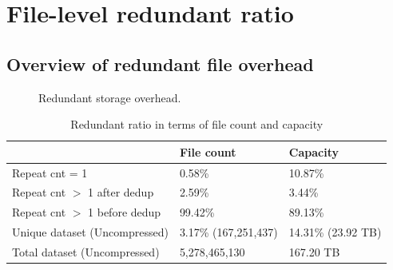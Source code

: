 \section{File-level redundant ratio}
\label{sec:dedup}

\subsection{Overview of redundant file overhead}

\begin{figure}
	\centering
	\caption{Redundant storage overhead.}
	\label{fig:over-dup-overhead}
\end{figure}

\begin{table} 
	\centering 
	\scriptsize  
	\caption{Redundant ratio in terms of file count and capacity} \label{tbl:overall-redundant_ratio} 
	\begin{tabular}{|l|l|l|}%
		\hline  
		       & File count & Capacity \\
		\hline
		Repeat cnt = 1 & 0.58\% & 10.87\%\\
		\hline
		Repeat cnt $>$ 1 after dedup & 2.59\% & 3.44\%\\
		\hline
		Repeat cnt $>$ 1 before dedup  & 99.42\%  & 89.13\%\\
		\hline
		Unique dataset (Uncompressed) & 3.17\% (167,251,437)  &  14.31\% (23.92 TB) \\
		\hline 
		Total dataset (Uncompressed) & 5,278,465,130 & 167.20 TB \\
		\hline 	
	\end{tabular} 
\end{table} 

